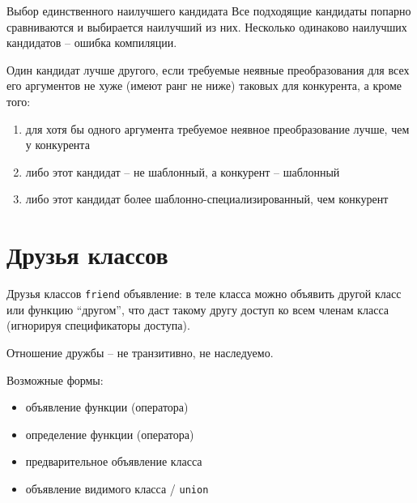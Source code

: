 \documentclass[unknownkeysallowed,xcolor=table]{beamer}
\begin{document}
\begin{frame}{Выбор единственного наилучшего кандидата}
Все подходящие кандидаты попарно сравниваются и выбирается наилучший из них. Несколько одинаково наилучших кандидатов -- ошибка компиляции.

\vspace{1em}

Один кандидат лучше другого, если требуемые неявные преобразования для всех его аргументов не хуже (имеют ранг не ниже) таковых для конкурента, а кроме того:

\begin{enumerate}
  \item для хотя бы одного аргумента требуемое неявное преобразование лучше, чем у конкурента
  \item либо этот кандидат -- не шаблонный, а конкурент -- шаблонный
  \item либо этот кандидат более шаблонно-специализированный, чем конкурент
\end{enumerate}

\end{frame}


\section{Друзья классов}

\begin{frame}{Друзья классов}
\lstinline{friend} объявление: в теле класса можно объявить другой класс или функцию ``другом'', что даст такому другу доступ ко всем членам класса (игнорируя спецификаторы доступа).

\vspace{1em}

Отношение дружбы -- не транзитивно, не наследуемо.

\vspace{1em}

Возможные формы:
\begin{itemize}
  \item объявление функции (оператора)
  \item определение функции (оператора)
  \item предварительное объявление класса
  \item объявление видимого класса / \lstinline{union}
\end{itemize}

\end{frame}
\end{document}
